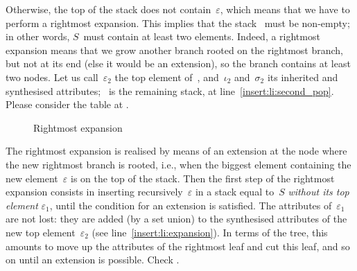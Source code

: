 Otherwise, the top of the stack does not contain~\(\varepsilon\),
which means that we have to perform a rightmost expansion. This
implies that the stack~ must be non\hyp{}empty; in other
words, \(S\)~must contain at least two elements. Indeed, a rightmost
expansion means that we grow another branch rooted on the rightmost
bran\-ch, but not at its end (else it would be an extension), so the
branch contains at least two nodes. Let us call~\(\varepsilon_2\) the
top element of~, and~\(\iota_2\) and~\(\sigma_2\) its
inherited and synthesised attributes; ~is the remaining stack,
at line~\ref{insert:li:second_pop}. Please consider the table at
.
\begin{figure}[b]
\centering
{}
\;
\caption{Rightmost expansion}
\end{figure}

The rightmost expansion is realised by means of an extension at the
node where the new rightmost branch is rooted, i.e., when the biggest
element containing the new element~\(\varepsilon\) is on the top of
the stack. Then the first step of the rightmost expansion consists in
inserting recursively~\(\varepsilon\) in a stack equal to~\(S\)
\emph{without its top element} \(\varepsilon_1\), until the condition
for an extension is satisfied. The attributes of~\(\varepsilon_1\) are
not lost: they are added (by a set union) to the synthesised
attributes of the new top element~\(\varepsilon_2\) (see
line~\ref{insert:li:expansion}). In terms of the \XML tree, this
amounts to move up the attributes of the rightmost leaf and cut this
leaf, and so on until an extension is possible. Check
.


